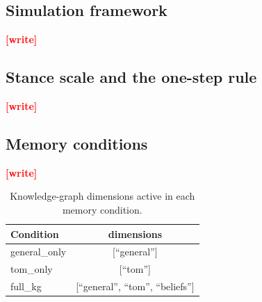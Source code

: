 \documentclass[11pt,a4paper]{article}
\newcommand{\pending}[1]{\textcolor{red}{\textbf{[#1]}}}   %
\newcommand{\cond}[1]{\textsf{#1}}                         %
\begin{document}
\subsection{Simulation framework}\label{sec:method-sim}
\pending{write}

\subsection{Stance scale and the one-step rule}\label{sec:method-clamp}
\pending{write}

\subsection{Memory conditions}\label{sec:method-memory}
\pending{write}

\begin{table}[t]
\centering
\small
\caption{Knowledge-graph dimensions active in each memory condition.}
\label{tab:dims}
\begin{tabular}{lc}
\toprule
Condition & dimensions \\
\midrule
\cond{general\_only} & [``general''] \\
\cond{tom\_only} & [``tom''] \\
\cond{full\_kg} & [``general'', ``tom'', ``beliefs''] \\
\bottomrule
\end{tabular}
\end{table}
\end{document}
